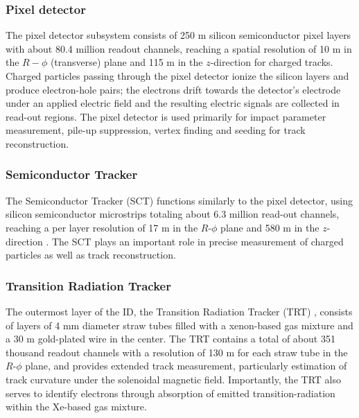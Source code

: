 \documentclass[../thesis.tex]{subfiles}
\begin{document}
\subsubsection*{Pixel detector}
The pixel detector subsystem \citep{atlas} consists of 250 \textmu m silicon semiconductor pixel layers with about 80.4 million readout channels, reaching a spatial resolution of 10 \textmu m in the $R-\phi$ (transverse) plane and 115 \textmu m in the $z$-direction for charged tracks. Charged particles passing through the pixel detector ionize the silicon layers and produce electron-hole pairs; the electrons drift towards the detector's electrode under an applied electric field and the resulting electric signals are collected in read-out regions. The pixel detector is used primarily for impact parameter measurement, pile-up suppression, vertex finding and seeding for track reconstruction.

\subsubsection*{Semiconductor Tracker}
The Semiconductor Tracker (\acs{SCT}) \citep{atlas} functions similarly to the pixel detector, using silicon semiconductor microstrips totaling about 6.3 million read-out channels, reaching a per layer resolution of 17 \textmu m in the $R$-$\phi$ plane and 580 \textmu m in the $z$-direction \citep{atlas}. The \acs{SCT} plays an important role in precise \pT measurement of charged particles as well as track reconstruction.

\subsubsection*{Transition Radiation Tracker}
The outermost layer of the \acs{ID}, the Transition Radiation Tracker (\acs{TRT}) \citep{atlas}, consists of layers of 4 mm diameter straw tubes filled with a xenon-based gas mixture and a 30 \textmu m gold-plated wire in the center. The \acs{TRT} contains a total of about 351 thousand readout channels with a resolution of 130 \textmu m for each straw tube in the $R$-$\phi$ plane, and provides extended track measurement, particularly estimation of track curvature under the solenoidal magnetic field. Importantly, the \acs{TRT} also serves to identify electrons through absorption of emitted transition-radiation within the Xe-based gas mixture.
\end{document}
